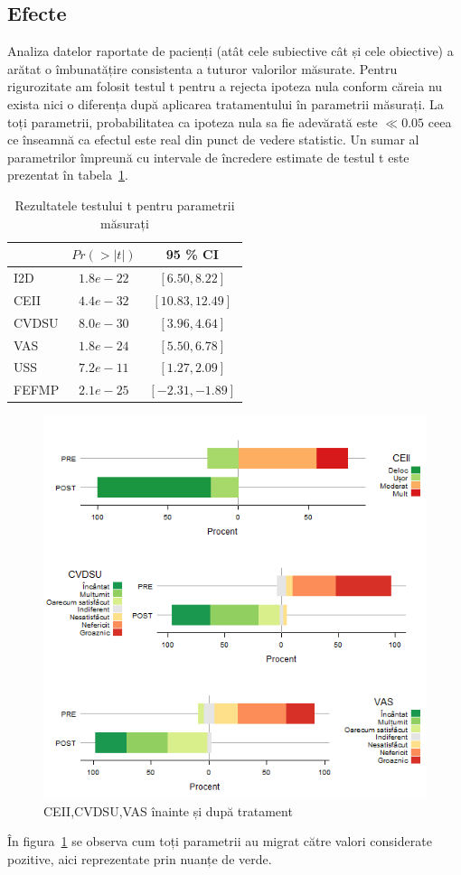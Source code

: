 \documentclass[12pt,draft]{article}
\begin{document}
\subsection{Efecte}
  Analiza datelor raportate de pacienți (atât cele subiective cât și cele obiective) a arătat o îmbunatățire consistenta a tuturor valorilor măsurate. Pentru rigurozitate am folosit testul t pentru a rejecta ipoteza nula conform căreia nu exista nici o diferența după aplicarea tratamentului în parametrii măsurați. La toți parametrii, probabilitatea ca ipoteza nula sa fie adevărată este $\ll 0.05$ ceea ce înseamnă ca efectul este real din punct de vedere statistic. Un sumar al parametrilor împreună cu intervale de încredere estimate de testul t este prezentat în tabela~\ref{tab:resTestSummary}.
  \begin{table}[H]
    \centering
    \begin{tabular}{|l|c|c|}
      \hline
       & $Pr(>|t|)$ & 95 \% CI \\   \hline
      I2D & 		$1.8e-22$ 	& $[ 6.50, 8.22 ]$ \\ \hline
      CEII & 		$4.4e-32$ 	& $[ 10.83, 12.49 ]$ \\ \hline
      CVDSU & $8.0e-30$ 	& $[ 3.96, 4.64 ]$ \\ \hline
      VAS & 		$1.8e-24$ 	& $[ 5.50, 6.78 ]$ \\ \hline
      USS & 		$7.2e-11$ 	& $[ 1.27, 2.09 ]$ \\ \hline
      FEFMP & $2.1e-25$ 	& $[ -2.31, -1.89 ]$ \\ \hline
    \end{tabular}
    \caption{Rezultatele testului t pentru parametrii măsurați} 
    \label{tab:resTestSummary}
  \end{table}
  \begin{figure}[H]
    \centering
    \includegraphics[width=0.8\linewidth]{incoResVariousStack}
    \caption{\ac{CEII},\ac{CVDSU},\ac{VAS} înainte și după tratament}
    \label{fig:incoResVariousStack}
  \end{figure}
  În figura~\ref{fig:incoResVariousStack} se observa cum toți parametrii au migrat către valori considerate pozitive, aici reprezentate prin nuanțe de verde. 
  
\end{document}
